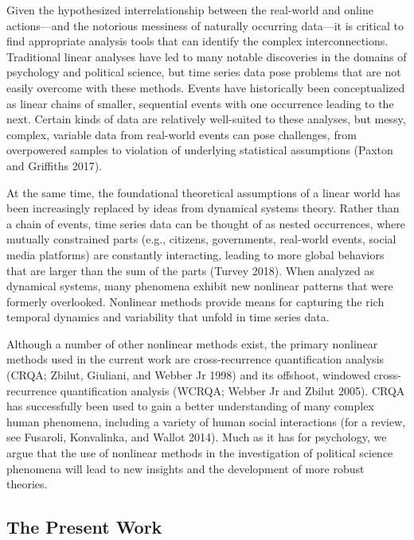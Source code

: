 \documentclass[english,man]{apa6}
\begin{document}
Given the hypothesized interrelationship between the real-world and online
actions---and the notorious messiness of naturally occurring data---it is
critical to find appropriate analysis tools that can identify the complex
interconnections. Traditional linear analyses have led to many notable
discoveries in the domains of psychology and political science, but time series
data pose problems that are not easily overcome with these methods. Events have
historically been conceptualized as linear chains of smaller, sequential events
with one occurrence leading to the next. Certain kinds of data are relatively
well-suited to these analyses, but messy, complex, variable data from real-world
events can pose challenges, from overpowered samples to violation of underlying
statistical assumptions (Paxton and Griffiths 2017).

At the same time, the foundational theoretical assumptions of a linear world has
been increasingly replaced by ideas from dynamical systems theory. Rather than a
chain of events, time series data can be thought of as nested occurrences, where
mutually constrained parts (e.g., citizens, governments, real-world events,
social media platforms) are constantly interacting, leading to more global
behaviors that are larger than the sum of the parts (Turvey 2018). When
analyzed as dynamical systems, many phenomena exhibit new nonlinear patterns
that were formerly overlooked. Nonlinear methods provide means for capturing the
rich temporal dynamics and variability that unfold in time series data.

Although a number of other nonlinear methods exist, the primary nonlinear methods
used in the current work are cross-recurrence quantification analysis (CRQA; Zbilut, Giuliani, and Webber Jr 1998) and its offshoot, windowed cross-recurrence quantification
analysis (WCRQA; Webber Jr and Zbilut 2005). CRQA has successfully been used to gain
a better understanding of many complex human phenomena, including a variety of
human social interactions (for a review, see Fusaroli, Konvalinka, and Wallot 2014). Much as it
has for psychology, we argue that the use of nonlinear methods in the
investigation of political science phenomena will lead to new insights and the
development of more robust theories.

\hypertarget{the-present-work}{%
\subsection{The Present Work}\label{the-present-work}}
\end{document}
